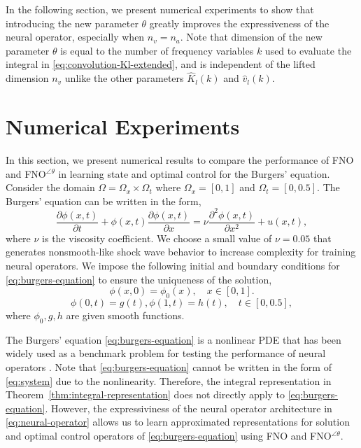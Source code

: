 \documentclass[letterpaper, 10 pt, conference]{ieeeconf}  %
\begin{document}
In the following section, we present numerical experiments to show that introducing the new parameter $\theta$ greatly improves the expressiveness of the neural operator, especially when $n_v = n_a$.
Note that dimension of the new parameter $\theta$ is equal to the number of frequency variables $k$ used to evaluate the integral in \eqref{eq:convolution-Kl-extended}, and is independent of the lifted dimension $n_v$ unlike the other parameters $\hat{K}_l(k)$ and $\hat{v}_l(k)$.


\section{Numerical Experiments}

In this section, we present numerical results to compare the performance of FNO and FNO$^{\angle \theta}$ in learning state and optimal control for the Burgers' equation.
Consider the domain $\Omega = \Omega_x \times \Omega_t$ where $\Omega_x = [0,1]$ and $\Omega_t=[0,0.5]$. The Burgers' equation can be written in the form,
\begin{equation}\label{eq:burgers-equation}
   \frac{\partial \phi(x,t)}{\partial t} + \phi(x,t) \frac{\partial \phi(x,t)}{\partial x} = \nu \frac{\partial^2 \phi(x,t)}{\partial x^2} + u(x,t),
\end{equation}
where $\nu$ is the viscosity coefficient.
We choose a small value of $\nu=0.05$ that generates nonsmooth-like shock wave behavior to increase complexity for training neural operators.
We impose the following initial and boundary conditions for \eqref{eq:burgers-equation} to ensure the uniqueness of the solution,
\begin{equation}\label{eq:burgers-initial-bondition}
   \phi(x,0) = \phi_0(x), \quad x\in [0,1].
\end{equation}
\begin{equation}\label{eq:burgers-boundary-condition}
   \phi(0,t) = g(t), \phi(1,t) = h(t), \quad t\in [0,0.5],
\end{equation}
where $\phi_0, g, h$ are given smooth functions.

The Burgers' equation \eqref{eq:burgers-equation} is a nonlinear PDE that has been widely used as a benchmark problem for testing the performance of neural operators \cite{li2020fourier,takamoto2022pdebench}.
Note that \eqref{eq:burgers-equation} cannot be written in the form of \eqref{eq:system} due to the nonlinearity. 
Therefore, the integral representation in Theorem~\ref{thm:integral-representation} does not directly apply to \eqref{eq:burgers-equation}.
However, the expressiviness of the neural operator architecture in \eqref{eq:neural-operator} allows us to learn approximated representations for solution and optimal control operators of \eqref{eq:burgers-equation} using FNO and FNO$^{\angle \theta}$. 
\end{document}
